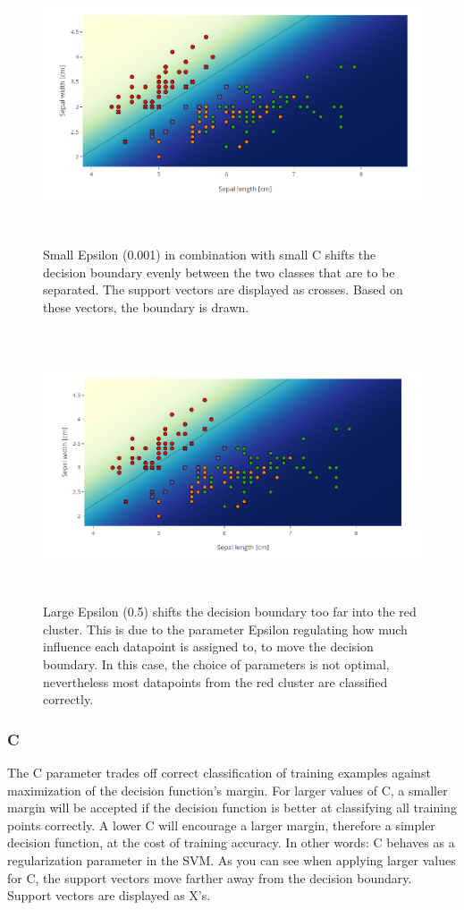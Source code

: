 \documentclass{scrartcl}
\begin{document}
\begin{figure}%
	\centering
	\includegraphics[height=8cm]{IrisLin001_1}
	\caption{Small Epsilon (0.001) in combination with small C shifts the decision boundary evenly between the two classes that are to be separated. The support vectors are displayed as crosses. Based on these vectors, the boundary is drawn.}
	\label{fig:example}%
\end{figure}

\begin{figure}%
	\centering
	\includegraphics[height=8cm]{IrisLin51}
	\caption{Large Epsilon (0.5) shifts the decision boundary too far into the red cluster. This is due to the parameter Epsilon regulating how much influence each datapoint is assigned to, to move the decision boundary. In this case, the choice of parameters is not optimal, nevertheless most datapoints from the red cluster are classified correctly.}%
	\label{fig:example}%
\end{figure}
\newpage
\subsubsection*{C}
The C parameter trades off correct classification of training examples against maximization of the decision function’s margin. For larger values of C, a smaller margin will be accepted if the decision function is better at classifying all training points correctly. A lower C will encourage a larger margin, therefore a simpler decision function, at the cost of training accuracy. In other words: C behaves as a regularization parameter in the SVM. As you can see when applying larger values for C, the support vectors move farther away from the decision boundary. Support vectors are displayed as X's. 
\end{document}
